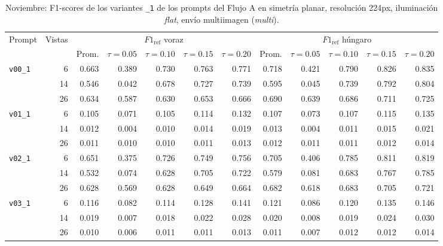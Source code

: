 \begin{table}[htbp]
\centering
\caption{Noviembre: F1-scores de los variantes \texttt{\_1} de los prompts del Flujo A en simetría planar, resolución 224px, iluminación \textit{flat}, envío multiimagen (\textit{multi}).}
\label{tab:nov_plane_variantes_1_f1}
\begin{lrbox}{\tablebox}
\begin{adjustbox}{max width=\textwidth}
\begin{tabular}{lrrrrrrrrrrr}
\toprule
\multirow{2}{*}{Prompt} & \multirow{2}{*}{Vistas} & \multicolumn{5}{c}{$F1_{\mathrm{ref}}$ voraz} & \multicolumn{5}{c}{$F1_{\mathrm{ref}}$ húngaro} \\
\cmidrule(lr){3-7} \cmidrule(lr){8-12}
 &  & Prom. & $\tau{=}0.05$ & $\tau{=}0.10$ & $\tau{=}0.15$ & $\tau{=}0.20$ & Prom. & $\tau{=}0.05$ & $\tau{=}0.10$ & $\tau{=}0.15$ & $\tau{=}0.20$ \\
\midrule
\multirow{3}{*}{\texttt{v00\_1}} & 6 & 0.663 & 0.389 & 0.730 & 0.763 & 0.771 & 0.718 & 0.421 & 0.790 & 0.826 & 0.835 \\
 & 14 & 0.546 & 0.042 & 0.678 & 0.727 & 0.739 & 0.595 & 0.045 & 0.739 & 0.792 & 0.804 \\
 & 26 & 0.634 & 0.587 & 0.630 & 0.653 & 0.666 & 0.690 & 0.639 & 0.686 & 0.711 & 0.725 \\
\midrule
\multirow{3}{*}{\texttt{v01\_1}} & 6 & 0.105 & 0.071 & 0.105 & 0.114 & 0.132 & 0.107 & 0.073 & 0.107 & 0.115 & 0.135 \\
 & 14 & 0.012 & 0.004 & 0.010 & 0.014 & 0.019 & 0.013 & 0.004 & 0.011 & 0.015 & 0.021 \\
 & 26 & 0.011 & 0.010 & 0.010 & 0.011 & 0.013 & 0.012 & 0.011 & 0.011 & 0.012 & 0.014 \\
\midrule
\multirow{3}{*}{\texttt{v02\_1}} & 6 & 0.651 & 0.375 & 0.726 & 0.749 & 0.756 & 0.705 & 0.406 & 0.785 & 0.811 & 0.819 \\
 & 14 & 0.532 & 0.074 & 0.628 & 0.705 & 0.722 & 0.579 & 0.081 & 0.683 & 0.767 & 0.785 \\
 & 26 & 0.628 & 0.569 & 0.628 & 0.649 & 0.664 & 0.682 & 0.618 & 0.683 & 0.705 & 0.721 \\
\midrule
\multirow{3}{*}{\texttt{v03\_1}} & 6 & 0.116 & 0.082 & 0.114 & 0.128 & 0.141 & 0.121 & 0.086 & 0.120 & 0.135 & 0.146 \\
 & 14 & 0.019 & 0.007 & 0.018 & 0.022 & 0.028 & 0.020 & 0.008 & 0.019 & 0.024 & 0.030 \\
 & 26 & 0.010 & 0.006 & 0.011 & 0.011 & 0.013 & 0.011 & 0.007 & 0.012 & 0.012 & 0.014 \\

\end{tabular}
\end{adjustbox}
\end{lrbox}
\end{table}

